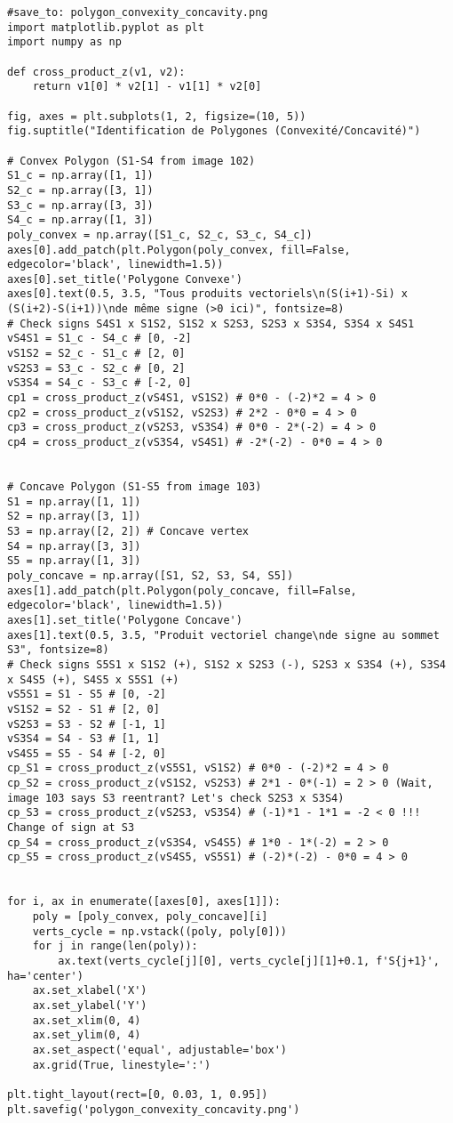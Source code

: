 \documentclass{article}
\begin{document}
\begin{verbatim}
#save_to: polygon_convexity_concavity.png
import matplotlib.pyplot as plt
import numpy as np

def cross_product_z(v1, v2):
    return v1[0] * v2[1] - v1[1] * v2[0]

fig, axes = plt.subplots(1, 2, figsize=(10, 5))
fig.suptitle("Identification de Polygones (Convexité/Concavité)")

# Convex Polygon (S1-S4 from image 102)
S1_c = np.array([1, 1])
S2_c = np.array([3, 1])
S3_c = np.array([3, 3])
S4_c = np.array([1, 3])
poly_convex = np.array([S1_c, S2_c, S3_c, S4_c])
axes[0].add_patch(plt.Polygon(poly_convex, fill=False, edgecolor='black', linewidth=1.5))
axes[0].set_title('Polygone Convexe')
axes[0].text(0.5, 3.5, "Tous produits vectoriels\n(S(i+1)-Si) x (S(i+2)-S(i+1))\nde même signe (>0 ici)", fontsize=8)
# Check signs S4S1 x S1S2, S1S2 x S2S3, S2S3 x S3S4, S3S4 x S4S1
vS4S1 = S1_c - S4_c # [0, -2]
vS1S2 = S2_c - S1_c # [2, 0]
vS2S3 = S3_c - S2_c # [0, 2]
vS3S4 = S4_c - S3_c # [-2, 0]
cp1 = cross_product_z(vS4S1, vS1S2) # 0*0 - (-2)*2 = 4 > 0
cp2 = cross_product_z(vS1S2, vS2S3) # 2*2 - 0*0 = 4 > 0
cp3 = cross_product_z(vS2S3, vS3S4) # 0*0 - 2*(-2) = 4 > 0
cp4 = cross_product_z(vS3S4, vS4S1) # -2*(-2) - 0*0 = 4 > 0


# Concave Polygon (S1-S5 from image 103)
S1 = np.array([1, 1])
S2 = np.array([3, 1])
S3 = np.array([2, 2]) # Concave vertex
S4 = np.array([3, 3])
S5 = np.array([1, 3])
poly_concave = np.array([S1, S2, S3, S4, S5])
axes[1].add_patch(plt.Polygon(poly_concave, fill=False, edgecolor='black', linewidth=1.5))
axes[1].set_title('Polygone Concave')
axes[1].text(0.5, 3.5, "Produit vectoriel change\nde signe au sommet S3", fontsize=8)
# Check signs S5S1 x S1S2 (+), S1S2 x S2S3 (-), S2S3 x S3S4 (+), S3S4 x S4S5 (+), S4S5 x S5S1 (+)
vS5S1 = S1 - S5 # [0, -2]
vS1S2 = S2 - S1 # [2, 0]
vS2S3 = S3 - S2 # [-1, 1]
vS3S4 = S4 - S3 # [1, 1]
vS4S5 = S5 - S4 # [-2, 0]
cp_S1 = cross_product_z(vS5S1, vS1S2) # 0*0 - (-2)*2 = 4 > 0
cp_S2 = cross_product_z(vS1S2, vS2S3) # 2*1 - 0*(-1) = 2 > 0 (Wait, image 103 says S3 reentrant? Let's check S2S3 x S3S4)
cp_S3 = cross_product_z(vS2S3, vS3S4) # (-1)*1 - 1*1 = -2 < 0 !!! Change of sign at S3
cp_S4 = cross_product_z(vS3S4, vS4S5) # 1*0 - 1*(-2) = 2 > 0
cp_S5 = cross_product_z(vS4S5, vS5S1) # (-2)*(-2) - 0*0 = 4 > 0


for i, ax in enumerate([axes[0], axes[1]]):
    poly = [poly_convex, poly_concave][i]
    verts_cycle = np.vstack((poly, poly[0]))
    for j in range(len(poly)):
        ax.text(verts_cycle[j][0], verts_cycle[j][1]+0.1, f'S{j+1}', ha='center')
    ax.set_xlabel('X')
    ax.set_ylabel('Y')
    ax.set_xlim(0, 4)
    ax.set_ylim(0, 4)
    ax.set_aspect('equal', adjustable='box')
    ax.grid(True, linestyle=':')

plt.tight_layout(rect=[0, 0.03, 1, 0.95])
plt.savefig('polygon_convexity_concavity.png')
\end{verbatim}
\end{document}
